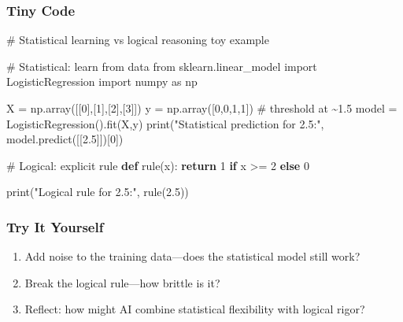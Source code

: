 \documentclass[
  letterpaper,
  DIV=11,
  numbers=noendperiod]{scrreprt}
\newenvironment{Shaded}{\begin{snugshade}}{\end{snugshade}}
\newcommand{\BuiltInTok}[1]{\textcolor[rgb]{0.00,0.23,0.31}{#1}}
\newcommand{\CommentTok}[1]{\textcolor[rgb]{0.37,0.37,0.37}{#1}}
\newcommand{\ControlFlowTok}[1]{\textcolor[rgb]{0.00,0.23,0.31}{\textbf{#1}}}
\newcommand{\DecValTok}[1]{\textcolor[rgb]{0.68,0.00,0.00}{#1}}
\newcommand{\FloatTok}[1]{\textcolor[rgb]{0.68,0.00,0.00}{#1}}
\newcommand{\ImportTok}[1]{\textcolor[rgb]{0.00,0.46,0.62}{#1}}
\newcommand{\KeywordTok}[1]{\textcolor[rgb]{0.00,0.23,0.31}{\textbf{#1}}}
\newcommand{\NormalTok}[1]{\textcolor[rgb]{0.00,0.23,0.31}{#1}}
\newcommand{\OperatorTok}[1]{\textcolor[rgb]{0.37,0.37,0.37}{#1}}
\newcommand{\StringTok}[1]{\textcolor[rgb]{0.13,0.47,0.30}{#1}}
\providecommand{\tightlist}{%
  \setlength{\itemsep}{0pt}\setlength{\parskip}{0pt}}
\begin{document}
\subsubsection{Tiny Code}\label{tiny-code-52}

\begin{Shaded}
\begin{Highlighting}[]
\CommentTok{\# Statistical learning vs logical reasoning toy example}

\CommentTok{\# Statistical: learn from data}
\ImportTok{from}\NormalTok{ sklearn.linear\_model }\ImportTok{import}\NormalTok{ LogisticRegression}
\ImportTok{import}\NormalTok{ numpy }\ImportTok{as}\NormalTok{ np}

\NormalTok{X }\OperatorTok{=}\NormalTok{ np.array([[}\DecValTok{0}\NormalTok{],[}\DecValTok{1}\NormalTok{],[}\DecValTok{2}\NormalTok{],[}\DecValTok{3}\NormalTok{]])}
\NormalTok{y }\OperatorTok{=}\NormalTok{ np.array([}\DecValTok{0}\NormalTok{,}\DecValTok{0}\NormalTok{,}\DecValTok{1}\NormalTok{,}\DecValTok{1}\NormalTok{])  }\CommentTok{\# threshold at \textasciitilde{}1.5}
\NormalTok{model }\OperatorTok{=}\NormalTok{ LogisticRegression().fit(X,y)}
\BuiltInTok{print}\NormalTok{(}\StringTok{"Statistical prediction for 2.5:"}\NormalTok{, model.predict([[}\FloatTok{2.5}\NormalTok{]])[}\DecValTok{0}\NormalTok{])}

\CommentTok{\# Logical: explicit rule}
\KeywordTok{def}\NormalTok{ rule(x):}
    \ControlFlowTok{return} \DecValTok{1} \ControlFlowTok{if}\NormalTok{ x }\OperatorTok{\textgreater{}=} \DecValTok{2} \ControlFlowTok{else} \DecValTok{0}

\BuiltInTok{print}\NormalTok{(}\StringTok{"Logical rule for 2.5:"}\NormalTok{, rule(}\FloatTok{2.5}\NormalTok{))}
\end{Highlighting}
\end{Shaded}

\subsubsection{Try It Yourself}\label{try-it-yourself-52}

\begin{enumerate}
\def\labelenumi{\arabic{enumi}.}
\tightlist
\item
  Add noise to the training data---does the statistical model still
  work?
\item
  Break the logical rule---how brittle is it?
\item
  Reflect: how might AI combine statistical flexibility with logical
  rigor?
\end{enumerate}
\end{document}
